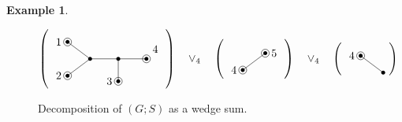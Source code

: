\documentclass[12pt]{amsart}
\theoremstyle{definition}
\newtheorem{eg}[thm]{Example}
\begin{document}
\begin{eg}
\begin{figure}[h]
\centering
$\left(
\raisebox{-0.5\height}{
\begin{tikzpicture}[scale=0.9]
	\coordinate (1) at (-1.8,0.6);
	\coordinate (2) at (-1.8,-0.6);
	\coordinate (3) at (0,-0.8);
	\coordinate (A) at (-1,0);
	\coordinate (B) at (0,0);
	\coordinate (C) at (1,0);

	\node[left=2pt] at (1) {$1$};
	\node[left=2pt] at (2) {$2$};
	\node[left=2pt] at (3) {$3$};
	\node[above right=2pt] at (C) {$4$};

	\draw (B) -- (A) -- (1);
	\draw (A) -- (2);
	\draw (3) -- (B) -- (C);
	
	\foreach \c in {1,2,3,A,B,C} {
		\fill[black] (\c) circle (2pt);
	}
	\foreach \c in {1,2,3,C} {
		\draw (\c) circle (4pt);
	}
\end{tikzpicture}
}
\right)
\quad \vee_4 \quad
\left(
\raisebox{-0.5\height}{
\begin{tikzpicture}[scale=0.9]
	\coordinate (5) at (1.8,0.6);
	\coordinate (C) at (1,0);

	\node[left=2pt] at (C) {$4$};
	\node[right=2pt] at (5) {$5$};

	\draw (C) -- (5);
	
	\foreach \c in {5,C} {
		\fill[black] (\c) circle (2pt);
	}
	\foreach \c in {C,5} {
		\draw (\c) circle (4pt);
	}
\end{tikzpicture}
}
\right)
\quad \vee_4 \quad
\left(
\raisebox{-0.5\height}{
\begin{tikzpicture}[scale=0.9]
	\coordinate (4) at (1.8,-0.6);
	\coordinate (C) at (1,0);

	\node[left=2pt] at (C) {$4$};

	\draw (C) -- (4);
	
	\foreach \c in {4,C} {
		\fill[black] (\c) circle (2pt);
	}
	\foreach \c in {C} {
		\draw (\c) circle (4pt);
	}
\end{tikzpicture}
}
\right)$
\caption{Decomposition of $(G; S)$ as a wedge sum.}
\label{fig:tree-wedge-sum}
\end{figure}

\end{eg}
\end{document}

